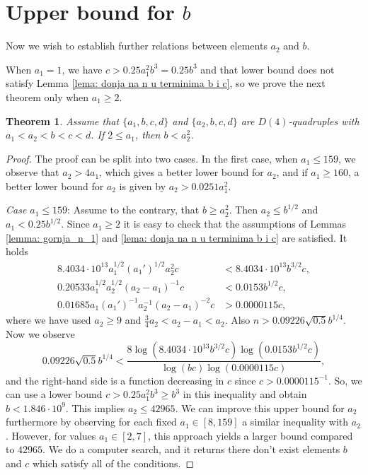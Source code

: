 \documentclass[12pt]{amsart}%
\newtheorem{theorem}{Theorem}[section]
\theoremstyle{definition}
\theoremstyle{remark}
\theoremstyle{plain}
\begin{document}
\section{Upper bound for $b$ }\label{sekcija_bound_2}

Now we wish to establish further relations between elements $a_2$ and $b$. 

When $a_1=1$, we have $c>0.25a_1^2b^3=0.25b^3$ and that lower bound does not satisfy Lemma \ref{lema: donja na n u terminima b i c}, so we prove the next theorem only when $a_1\geq 2$.
\begin{theorem}
    Assume that $\{a_1,b,c,d\}$ and $\{a_2,b,c,d\}$ are $D(4)$-quadruples with $a_1<a_2<b<c<d$. 
        If $2\leq a_1$, then $b<a_2^2$.
\end{theorem}
\begin{proof}
 The proof can be split into two cases. In the first case, when $a_1\leq 159$, we observe that $a_2 > 4a_1$, which gives a better lower bound for $a_2$, and if $a_1\geq 160$, a better lower bound for $a_2$ is given by $a_2 > 0.0251a_1^2$. 


\textit{ Case $a_1\leq 159$}:
Assume to the contrary, that $b\geq a_2^2$. Then $a_2\leq b^{1/2}$ and $a_1<0.25b^{1/2}$. Since $a_1\geq 2$ it is easy to check that the assumptions of Lemmas \ref{lemma: gornja_n_1} and \ref{lema: donja na n u terminima b i c} are satisfied. It holds
 \begin{align*}
 8.4034\cdot 10^{13}a_1^{1/2}(a_1')^{1/2}a_2^2c&<8.4034\cdot 10^{13}b^{3/2}c,\\
 0.20533a_1^{1/2}a_2^{1/2}(a_2-a_1)^{-1}c&<0.0153b^{1/2}c,\\
 0.01685a_1(a_1')^{-1}a_2^{-1}(a_2-a_1)^{-2}c&>0.0000115c, 
\end{align*}
where we have used $a_2\geq 9$ and $\frac{3}{4}a_2<a_2-a_1<a_2$. Also $n>0.09226\sqrt{0.5}b^{1/4}$. Now we observe
$$0.09226\sqrt{0.5}b^{1/4}<\frac{8\log(8.4034\cdot 10^{13}b^{3/2}c)\log(0.0153b^{1/2}c)}{\log(bc)\log(0.0000115c)},$$
and the right-hand side is a function decreasing in $c$ since $c>0.0000115^{-1}$. So, we can use a lower bound $c>0.25a_1^2b^3\geq b^3$ in this inequality and obtain $b<1.846\cdot 10^9$. This implies $a_2\leq 42965$. We can improve this upper bound for $a_2$ furthermore by observing for each fixed $a_1\in[8,159]$ a similar inequality with $a_2$. However, for values $a_1\in[2,7]$, this approach yields a larger bound compared to $42965$.   We do a computer search, and it returns there don't exist elements $b$ and $c$ which satisfy all of the conditions. 


\end{proof}
\end{document}
